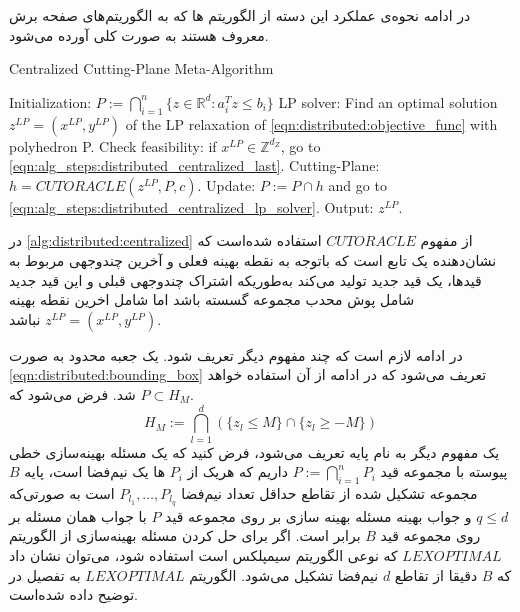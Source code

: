 	در ادامه نحوه‌ی عملکرد این دسته از الگوریتم ها که به الگوریتم‌های صفحه برش معروف هستند به صورت کلی آورده می‌شود. 
\begin{latin}
	\begin{algorithm}
		\caption{Centralized Cutting-Plane Meta-Algorithm}
		\label{alg:distributed:centralized}
		\begin{algorithmic}[1]
			\State Initialization: $ P := \bigcap_{i=1}^n \{ z \in \mathbb{R}^d : a_i^Tz \le b_i\}$
			\State LP solver: Find an optimal solution $z^{LP} = (x^{LP},y^{LP})$ of the LP relaxation of \cref{eqn:distributed:objective_func} with polyhedron P. \label{eqn:alg_steps:distributed_centralized_lp_solver}
			\State Check feasibility: if $x^{LP} \in \mathbb{Z}^{d_Z}$, go to \cref{eqn:alg_steps:distributed_centralized_last}.
			\State Cutting-Plane: $h = CUTORACLE(z^{LP},P,c)$.
			\State Update: $P := P \cap h$ and go to \cref{eqn:alg_steps:distributed_centralized_lp_solver}.
			\State Output: $z^{LP}$\label{eqn:alg_steps:distributed_centralized_last}.
		\end{algorithmic}
	\end{algorithm}
\end{latin}

	در \cref{alg:distributed:centralized} از مفهوم $CUTORACLE$ استفاده شده‌است که نشان‌دهنده یک تابع است که باتوجه به نقطه بهینه فعلی و آخرین چندوجهی مربوط به قیدها، یک قید جدید تولید می‌کند به‌طوریکه اشتراک چندوجهی قبلی و این قید جدید شامل پوش محدب مجموعه گسسته  باشد اما شامل اخرین نقطه بهینه $z^{LP} = (x^{LP},y^{LP})$ نباشد.
	
	در ادامه لازم است که چند مفهوم دیگر تعریف شود. یک جعبه محدود به صورت \cref{eqn:distributed:bounding_box} تعریف می‌شود که در ادامه از آن استفاده خواهد شد. فرض می‌شود که $P \subset H_M$.
\begin{equation}\label{eqn:distributed:bounding_box}
H_M := \bigcap_{l=1}^d (\{ z_l \le M \} \cap \{ z_l \ge -M \})
\end{equation}
	یک مفهوم دیگر به نام پایه تعریف می‌شود، فرض کنید که یک مسئله بهینه‌سازی خطی پیوسته با مجموعه قید $P := \bigcap_{i=1}^n P_i$ داریم که هریک از $P_i$ ها یک نیم‌فضا است، پایه $B$ مجموعه‌ تشکیل شده از تقاطع حداقل تعداد نیم‌فضا $P_{l_1}, \dots, P_{l_q}$ است به صورتی‌که $q \le d$ و جواب بهینه مسئله بهینه سازی بر روی مجموعه قید $P$ با جواب همان مسئله بر روی مجموعه قید $B$ برابر است. اگر برای حل کردن مسئله بهینه‌سازی از الگوریتم $LEXOPTIMAL$ که نوعی الگوریتم سیمپلکس است استفاده شود، می‌توان نشان داد که $B$ دقیقا از تقاطع $d$ نیم‌فضا تشکیل می‌شود.  الگوریتم $LEXOPTIMAL$ به تفصیل در \cite{jones2007lexicographic} توضیح داده شده‌است.
	
